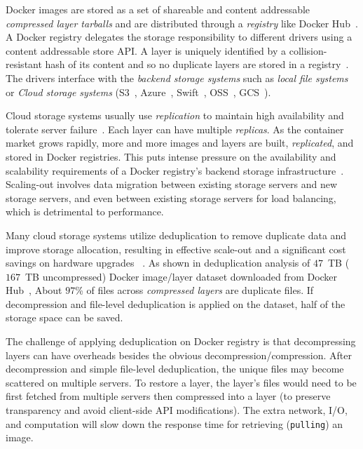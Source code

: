 Docker images are stored as a set of shareable and content addressable \emph{compressed layer tarballs} 
and are distributed through a \emph{registry} like Docker Hub~\cite{docker-hub}.
A Docker registry delegates the storage responsibility to 
different drivers using a content addressable store API.
A layer is uniquely identified by a collision-resistant hash of its content and 
so no duplicate layers are stored in a registry~\cite{docker-hub}.
The drivers interface with the \emph{backend storage systems}
such as \emph{local file systems} or \emph{Cloud storage systems} (\eg S3~\cite{s3}, Azure~\cite{azuredriver}, Swift~\cite{swift}, OSS~\cite{oss}, GCS~\cite{gcs}).


Cloud storage systems usually use \emph{replication} to maintain high availability and tolerate server failure~\cite{Bonvin:2010:SFS:1807128.1807162}.
Each layer can have multiple \emph{replicas}.
As the container market grows rapidly, 
more and more images and layers are built, \emph{replicated}, and stored in Docker registries.
This puts intense pressure on the availability and scalability requirements of a Docker registry's backend storage infrastructure~\cite{5655241}. 
Scaling-out involves data migration between existing storage servers and new storage servers, 
and even between existing storage servers for load balancing,
which is detrimental to performance.

Many cloud storage systems utilize deduplication to remove duplicate data and improve storage allocation, resulting in
effective scale-out and a significant cost savings on hardware upgrades
~\cite{Ng:2012:PDD:2245276.2245361, 6753819, 5655241}.
As shown in deduplication analysis of $47$~TB ($167$~TB uncompressed) 
Docker image/layer dataset downloaded from Docker Hub~\cite{dedupanalysis},
About $97$\% of files across \emph{compressed layers} are duplicate files.
If decompression and file-level deduplication is applied on the dataset, %
half of the storage space can be saved.

The challenge of applying deduplication on Docker registry 
is that decompressing layers can have overheads besides the obvious decompression/compression. 
After decompression and simple file-level deduplication, 
the unique files may become scattered on
multiple servers. 
To restore a %
layer,
the layer's files would need to be first fetched from multiple servers then compressed into a layer (to preserve transparency and avoid client-side API modifications).
The extra network, I/O, and computation will slow down the response time for retrieving (\texttt{pulling}) an image.

